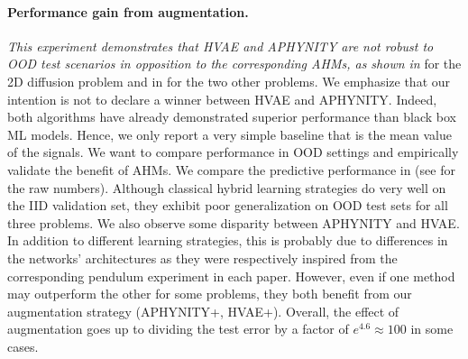 \paragraph{Performance gain from augmentation.}
\textit{This experiment demonstrates that HVAE and APHYNITY are not robust to OOD test scenarios in opposition to the corresponding AHMs, as shown in } for the 2D diffusion problem and in  for the two other problems. We emphasize that our intention is not to declare a winner between HVAE and APHYNITY. Indeed, both algorithms have already demonstrated superior performance than black box ML models. Hence, we only report a very simple baseline that is the mean value of the signals. We want to compare performance in OOD settings and empirically validate the benefit of AHMs.
We compare the predictive performance in  (see  for the raw numbers).  Although classical hybrid learning strategies do very well on the IID validation set, they exhibit poor generalization on OOD test sets for all three problems. We also observe some disparity between APHYNITY and HVAE. In addition to different learning strategies, this is probably due to differences in the networks' architectures as they were respectively inspired from the corresponding pendulum experiment in each paper. However, even if one method may outperform the other for some problems, they both benefit from our augmentation strategy (APHYNITY+, HVAE+). Overall, the effect of augmentation goes up to dividing the test error by a factor of $e^{4.6}\approx 100$ in some cases.

